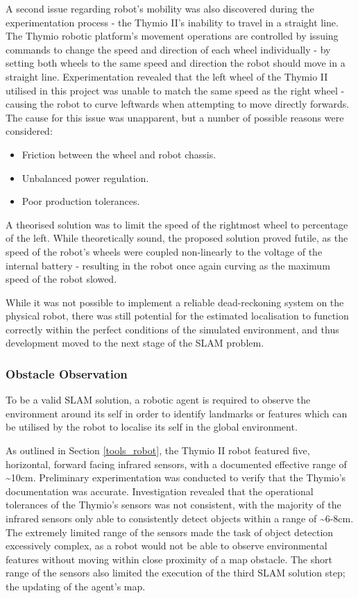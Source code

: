 A second issue regarding robot's mobility was also discovered during the
experimentation process - the Thymio II's inability to travel in a straight
line.  
The Thymio robotic platform's movement operations are controlled by issuing
commands to change the speed and direction of each wheel individually - by
setting both wheels to the same speed and direction the robot should move in a
straight line.
Experimentation revealed that the left wheel of the Thymio II utilised in this
project was unable to match the same speed as the right wheel - causing the
robot to curve leftwards when attempting to move directly forwards.
The cause for this issue was unapparent, but a number of possible reasons were
considered:

\begin{itemize}
\item Friction between the wheel and robot chassis.
\item Unbalanced power regulation.
\item Poor production tolerances.
\end{itemize}

A theorised solution was to limit the speed of the rightmost wheel to
percentage of the left.
While theoretically sound, the proposed solution proved futile, as the speed of
the robot's wheels were coupled non-linearly to the voltage of the internal
battery - resulting in the robot once again curving as the maximum speed of
the robot slowed.

While it was not possible to implement a reliable dead-reckoning
system on the physical robot, there was still potential for the estimated
localisation to function correctly within the perfect conditions of the
simulated environment, and thus development moved to the next stage of the
SLAM problem.

\subsubsection{Obstacle Observation}
To be a valid SLAM solution, a robotic agent is required to observe the
environment around its self in order to identify landmarks or features which
can be utilised by the robot to localise its self in the global environment.

As outlined in Section \ref{tools_robot}, the Thymio II robot featured five,
horizontal, forward facing infrared sensors, with a documented effective range
of \~{}10cm.  
Preliminary experimentation was conducted to verify that the Thymio's
documentation was accurate.
Investigation revealed that the operational tolerances of the Thymio's sensors
was not consistent, with the majority of the infrared sensors only able to
consistently detect objects within a range of \~{}6-8cm.
The extremely limited range of the sensors made the task of object detection
excessively complex, as a robot would not be able to observe environmental
features without moving within close proximity of a map obstacle.
The short range of the sensors also limited the execution of the third SLAM
solution step; the updating of the agent's map.

